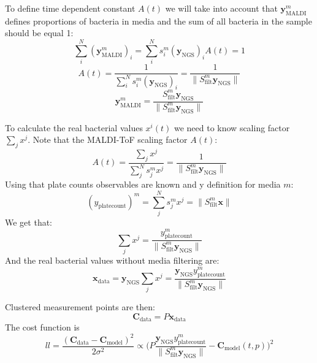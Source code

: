 \documentclass[10pt,A4paper]{article}
\begin{document}
To define time dependent constant $A(t)$ we will take into account that $\mathbf{y}^m_\text{MALDI}$ defines proportions of bacteria in media and the sum of all bacteria in the sample should be equal 1:
\begin{equation}
    \sum_i^N (\mathbf{y}^m_\text{MALDI})_i = \sum_i^N s_i^m (\mathbf{y}_\text{NGS})_i A(t) = 1
 \end{equation}
 \begin{equation}
    A(t) = \frac{1}{\sum_i^N s_i^m (\mathbf{y}_\text{NGS})_i} = \frac{1}{\lVert S^m_\text{filt} \mathbf{y}_\text{NGS} \rVert}
 \end{equation}
 \begin{equation}
    \boxed{\mathbf{y}^m_\text{MALDI} = \frac{S^m_\text{filt} \mathbf{y}_\text{NGS}}{\lVert S^m_\text{filt} \mathbf{y}_\text{NGS} \rVert}}
    \label{eq:obs_maldi}
\end{equation}

To calculate the real bacterial values $x^i(t)$ we need to know scaling factor $\sum_j x^j$.
Note that the MALDI-ToF scaling factor $A(t)$:
\begin{equation}
    A(t) = \frac{\sum_j x^j}{\sum_j^N s^m_j x^j} = \frac{1}{\lVert S^m_\text{filt} \mathbf{y}_\text{NGS} \rVert}
\end{equation}
Using that plate counts observables are known and y definition for media $m$:
\begin{equation}
    (y_\text{platecount})^m = \sum_j^N s^m_j x^j = \lVert S^m_\text{filt} \mathbf{x} \rVert
\end{equation}
We get that:
\begin{equation}
    \sum_j x^j = \frac{y_\text{platecount}^m}{\lVert S^m_\text{filt} \mathbf{y}_\text{NGS} \rVert}
\end{equation}
And the real bacterial values without media filtering are:
\begin{equation}
    \boxed{\mathbf{x}_\text{data} = \mathbf{y}_\text{NGS} \sum_j x^j = \frac{\mathbf{y}_\text{NGS} y_\text{platecount}^m}{\lVert S^m_\text{filt} \mathbf{y}_\text{NGS} \rVert}}
    \label{eq:X_real}
\end{equation}

Clustered measurement points are then:
\begin{equation}
    \mathbf{C}_\text{data} = P \mathbf{x}_\text{data}
\end{equation} 
The cost function is 
\begin{equation}
    ll = \frac{(\mathbf{C}_\text{data} - \mathbf{C}_\text{model})^2}{2 \sigma^2} \propto \bigg (P \frac{\mathbf{y}_\text{NGS} y_\text{platecount}^m}{\lVert S^m_\text{filt} \mathbf{y}_\text{NGS} \rVert} - \mathbf{C}_\text{model} (t, p) \bigg )^2
\end{equation}
\end{document}
